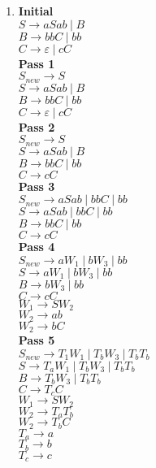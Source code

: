 \documentclass[11pt]{article}
\newcommand{\pipe}{\hspace{3pt}|\hspace{3pt}}
\theoremstyle{definition}
\theoremstyle{case}
\theoremstyle{theorem}
\begin{document}
\begin{enumerate}[label=(\alph*)]

\item
\textbf{Initial} \\
$S \rightarrow aSab \pipe B$ \\
$B \rightarrow bbC \pipe bb$ \\
$C \rightarrow \varepsilon \pipe cC$ \\
\textbf{Pass 1} \\
$S_{new} \rightarrow S$ \\
$S \rightarrow aSab \pipe B$ \\
$B \rightarrow bbC \pipe bb$ \\
$C \rightarrow \varepsilon \pipe cC$ \\
\textbf{Pass 2} \\
$S_{new} \rightarrow S$ \\
$S \rightarrow aSab \pipe B$ \\
$B \rightarrow bbC \pipe bb$ \\
$C \rightarrow cC$ \\
\textbf{Pass 3} \\
$S_{new} \rightarrow aSab \pipe bbC \pipe bb$ \\
$S \rightarrow aSab \pipe bbC \pipe bb$ \\
$B \rightarrow bbC \pipe bb$ \\
$C \rightarrow cC$ \\
\textbf{Pass 4} \\
$S_{new} \rightarrow aW_1 \pipe bW_3 \pipe bb$ \\
$S \rightarrow aW_1 \pipe bW_3 \pipe bb$ \\
$B \rightarrow bW_3 \pipe bb$ \\
$C \rightarrow cC$ \\
$W_1 \rightarrow SW_2$ \\
$W_2 \rightarrow ab$ \\
$W_2 \rightarrow bC$ \\
\textbf{Pass 5} \\
$S_{new} \rightarrow T_{1}W_{1} \pipe T_{b}W_{3} \pipe T_{b}T_{b}$ \\
$S \rightarrow T_{a}W_{1} \pipe T_{b}W_{3} \pipe T_{b}T_{b}$ \\
$B \rightarrow T_{b}W_{3} \pipe T_{b}T_{b}$ \\
$C \rightarrow T_{c}C$ \\
$W_1 \rightarrow SW_2$ \\
$W_2 \rightarrow T_{a}T_{b}$ \\
$W_2 \rightarrow T_{b}C$ \\
$T_a \rightarrow a$ \\
$T_b \rightarrow b$ \\
$T_c \rightarrow c$


\end{enumerate}
\end{document}
